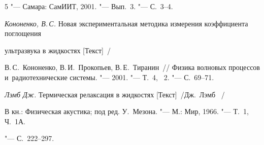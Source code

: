 \begin{thebibliography}{5}
"--- Самара: СамИИТ, 2001. "--- Вып.~3. "--- С.~3--4.



\item

\textit{Кононенко, В.\,С. }Новая экспериментальная методика измерения коэффициента поглощения 

ультразвука в жидкостях [Текст]~/ 

В.\,С.~Кононенко, В.\,И.~Прокопьев, В.\,Е.~Тиранин~/\!/ Физика волновых процессов и~радиотехнические системы. "--- 2001. "--- Т.~4, \No~2. "--- С.~69--71.



\item

{\it Лэмб Дж.} Термическая релаксация в жидкостях [Текст]~/Дж.~Лэмб~ /

В кн.: Физическая акустика; под ред. У.~Мезона. "--- М.: Мир, 1966. "--- Т.~1, Ч.~1А. 

"--- С.~222--297.



\end{thebibliography}



\lfoot[]{}

  \rfoot[]{}



\vspace{10mm}

\makeengtitle



%

